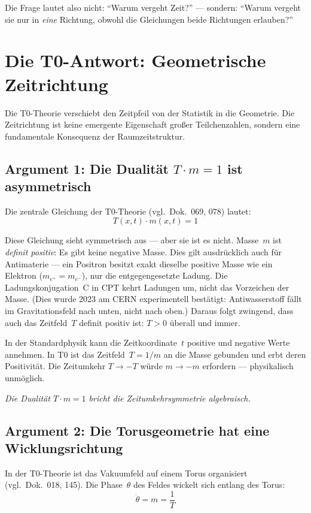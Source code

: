 Die Frage lautet also nicht: ``Warum vergeht Zeit?'' --- sondern: ``Warum vergeht sie nur in \emph{eine} Richtung, obwohl die Gleichungen beide Richtungen erlauben?''


\section{Die T0-Antwort: Geometrische Zeitrichtung}

Die T0-Theorie verschiebt den Zeitpfeil von der Statistik in die Geometrie. Die Zeitrichtung ist keine emergente Eigenschaft großer Teilchenzahlen, sondern eine fundamentale Konsequenz der Raumzeitstruktur.

\subsection{Argument 1: Die Dualität $T \cdot m = 1$ ist asymmetrisch}

Die zentrale Gleichung der T0-Theorie (vgl.\ Dok.~069, 078) lautet:
\begin{equation}
	T(x,t) \cdot m(x,t) = 1
\end{equation}

Diese Gleichung sieht symmetrisch aus --- aber sie ist es nicht. Masse~$m$ ist \emph{definit positiv}: Es gibt keine negative Masse. Dies gilt ausdrücklich auch für Antimaterie --- ein Positron besitzt exakt dieselbe positive Masse wie ein Elektron ($m_{e^+} = m_{e^-}$), nur die entgegengesetzte Ladung. Die Ladungskonjugation~C in CPT kehrt Ladungen um, nicht das Vorzeichen der Masse. (Dies wurde 2023 am CERN experimentell bestätigt: Antiwasserstoff fällt im Gravitationsfeld nach unten, nicht nach oben.) Daraus folgt zwingend, dass auch das Zeitfeld~$T$ definit positiv ist: $T > 0$ überall und immer.

In der Standardphysik kann die Zeitkoordinate~$t$ positive und negative Werte annehmen. In T0 ist das Zeitfeld~$T = 1/m$ an die Masse gebunden und erbt deren Positivität. Die Zeitumkehr $T \to -T$ würde $m \to -m$ erfordern --- physikalisch unmöglich.

\emph{Die Dualität $T \cdot m = 1$ bricht die Zeitumkehrsymmetrie algebraisch.}

\subsection{Argument 2: Die Torusgeometrie hat eine Wicklungsrichtung}

In der T0-Theorie ist das Vakuumfeld auf einem Torus organisiert (vgl.\ Dok.~018, 145). Die Phase~$\theta$ des Feldes wickelt sich entlang des Torus:
\begin{equation}
	\dot{\theta} = m = \frac{1}{T}
\end{equation}

